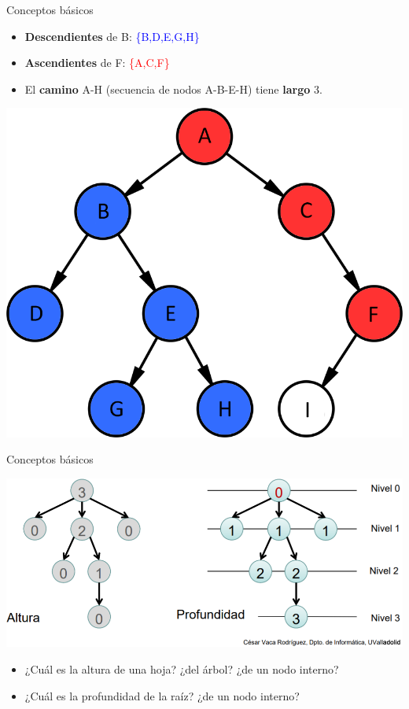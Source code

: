 \documentclass[handout]{beamer} %
\newcommand{\blue}[1]{\textcolor{blue}{#1}}
\newcommand{\red}[1]{\textcolor{red}{#1}}
\begin{document}
\begin{frame}{Conceptos básicos}
    \begin{minipage}{0.6\textwidth}
    \begin{itemize}
        \item<1-> \textbf{Descendientes} de B: \blue{\{B,D,E,G,H\}}\\
        \item<3-> \textbf{Ascendientes} de F: \red{\{A,C,F\}}
        \item<4-> El \textbf{camino} A-H (secuencia de nodos A-B-E-H) tiene \textbf{largo} 3.
    \end{itemize}
    \end{minipage}
    \begin{minipage}{0.38\textwidth}
        \includegraphics[width=\textwidth]{./image/cap3/tree2}
    \end{minipage}
\end{frame}

\begin{frame}{Conceptos básicos}
    \begin{center}
        \includegraphics[width=\textwidth]{./image/cap3/tree3}
    \end{center}
    {\small
    \begin{itemize}
        \item<2-> ¿Cuál es la altura de una hoja? ¿del árbol? ¿de un nodo interno?
        \item<2-> ¿Cuál es la profundidad de la raíz? ¿de un nodo interno?
    \end{itemize}}
\end{frame}
\end{document}
